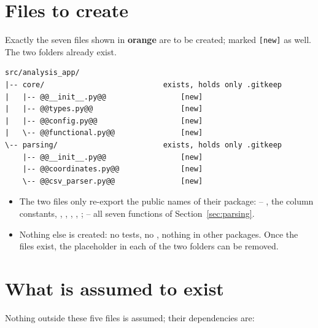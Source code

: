 \documentclass{article}
\begin{document}
\section{Files to create}

Exactly the seven files shown in \textcolor{newcolor}{\textbf{orange}} are to
be created; marked \texttt{[new]} as well. The two folders already exist.

\begin{lstlisting}
src/analysis_app/
|-- core/                           exists, holds only .gitkeep
|   |-- @@__init__.py@@                 [new]
|   |-- @@types.py@@                    [new]
|   |-- @@config.py@@                   [new]
|   \-- @@functional.py@@               [new]
\-- parsing/                        exists, holds only .gitkeep
    |-- @@__init__.py@@                 [new]
    |-- @@coordinates.py@@              [new]
    \-- @@csv_parser.py@@               [new]
\end{lstlisting}

\begin{itemize}
\item The two  files only re-export the public names of
      their package:  -- , the column constants,
      , , ,
      , ;  -- all seven
      functions of Section~\ref{sec:parsing}.
\item Nothing else is created: no tests, no , nothing in
      other packages. Once the files exist, the placeholder 
      in each of the two folders can be removed.
\end{itemize}

\section{What is assumed to exist}

Nothing outside these five files is assumed; their dependencies are:
\end{document}
